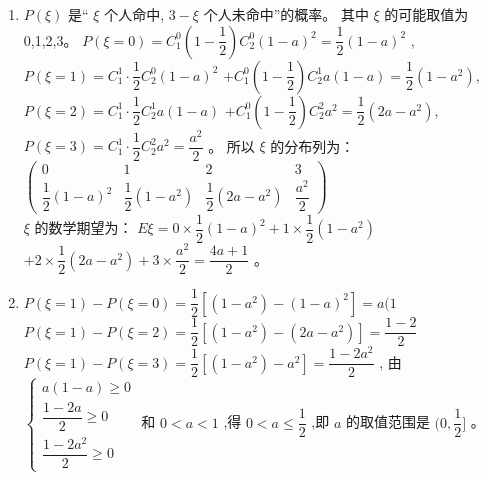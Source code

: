 \begin{enumerate}
\begin{jieda}
    \begin{enumerate}
        \item $P\left( \xi \right)$ 是“ $\xi$ 个人命中, $3 - \xi$ 个人未命中”的概率。
其中 $\xi$ 的可能取值为0,1,2,3。
$P\left( {\xi  = 0}\right)  = {{C}}_{1}^{0}\left( {1 - \dfrac{1}{2}}\right) {{C}}_{2}^{0}{\left( 1 - a\right) }^{2} = \dfrac{1}{2}{\left( 1 - a\right) }^{2}$ ,
$P\left( {\xi  = 1}\right)  = {C}_{1}^{1} \cdot  \dfrac{1}{2}{C}_{2}^{0}{\left( 1 - a\right) }^{2}$
$+ {C}_{1}^{0}\left( {1 - \dfrac{1}{2}}\right) {C}_{2}^{1}a\left( {1 - a}\right)  = \dfrac{1}{2}\left( {1 - {a}^{2}}\right) ,$
$P\left( {\xi  = 2}\right)  = {C}_{1}^{1} \cdot  \dfrac{1}{2}{C}_{2}^{1}a\left( {1 - a}\right)$
$+ {C}_{1}^{0}\left( {1 - \dfrac{1}{2}}\right) {C}_{2}^{2}{a}^{2} = \dfrac{1}{2}\left( {{2a} - {a}^{2}}\right) ,$
$P\left( {\xi  = 3}\right)  = {{C}}_{1}^{1} \cdot  \dfrac{1}{2}{{C}}_{2}^{2}{a}^{2} = \dfrac{{a}^{2}}{2}$ 。
所以 $\xi$ 的分布列为：
$\begin{pmatrix}
     0 & 1&  2& 3\\
    \dfrac{1}{2}{\left( 1 - a\right) }^{2}&\dfrac{1}{2}\left( {1 - {a}^{2}}\right)&\dfrac{1}{2}\left( {{2a} - {a}^{2}}\right)&\dfrac{{a}^{2}}{2}
\end{pmatrix}$\\
$\xi$ 的数学期望为：
${E\xi } = 0 \times  \dfrac{1}{2}{\left( 1 - a\right) }^{2} + 1 \times  \dfrac{1}{2}\left( {1 - {a}^{2}}\right)$
$+ 2 \times  \dfrac{1}{2}\left( {{2a} - {a}^{2}}\right)  + 3 \times  \dfrac{{a}^{2}}{2} = \dfrac{{4a} + 1}{2}$ 。

    \item $P\left( {\xi  = 1}\right)  - P\left( {\xi  = 0}\right)  = \dfrac{1}{2}\left\lbrack  {\left( {1 - {a}^{2}}\right)  - {\left( 1 - a\right) }^{2}}\right\rbrack   = a(1$
$P\left( {\xi  = 1}\right)  - P\left( {\xi  = 2}\right)  = \dfrac{1}{2}\left\lbrack  {\left( {1 - {a}^{2}}\right)  - \left( {{2a} - {a}^{2}}\right) }\right\rbrack   = \dfrac{1 - 2}{2}$
$P\left( {\xi  = 1}\right)  - P\left( {\xi  = 3}\right)  = \dfrac{1}{2}\left\lbrack  {\left( {1 - {a}^{2}}\right)  - {a}^{2}}\right\rbrack   = \dfrac{1 - 2{a}^{2}}{2}$ ,
由 $\left\{  \begin{array}{l} a\left( {1 - a}\right)  \geq  0 \\  \dfrac{1 - {2a}}{2} \geq  0 \\  \dfrac{1 - 2{a}^{2}}{2} \geq  0 \end{array}\right.$ 和 $0 < a < 1$ ,得 $0 < a \leq  \dfrac{1}{2}$ ,即 $a$ 的取值范围是 $(0,\dfrac{1}{2}\rbrack$ 。


\end{enumerate}
\end{jieda}
\end{enumerate}
